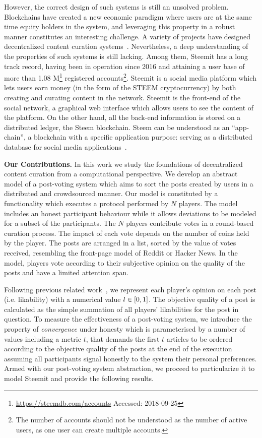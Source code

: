    However, the correct design of such systems is still an unsolved problem. Blockchains have created a new economic paradigm where users are at the same time equity holders in the system, and leveraging this property in a robust manner constitutes an interesting challenge.
   A variety of projects have designed decentralized content curation systems~\cite{synereo,steemit,tcr}. Nevertheless, a deep understanding of the properties of such systems is still lacking. Among them, Steemit
has a long track record, having been in operation since 2016 and attaining a user base of more than 1.08 M\footnote{\url{https://steemdb.com/accounts} Accessed: 2018-09-25} registered accounts\footnote{The number of accounts should not be understood as the number of active users, as one user can create multiple accounts.}. Steemit is a social media platform which lets users earn money (in the form of the STEEM cryptocurrency) by both creating and curating content in the network. Steemit is the front-end of the social network, a graphical web interface which allows users to see the content of the platform. On the other hand, all the back-end information is stored on a distributed ledger, the Steem blockchain. Steem can be understood as an ``app-chain'', a blockchain with a specific application purpose: serving as a distributed database for social media applications~\cite{steemit}.

\noindent  \textbf{Our Contributions.}
In this work we study the foundations of decentralized content curation from a computational perspective. We develop an abstract model of a post-voting system which aims to sort the posts created by users in a distributed and crowdsourced manner.
  Our model is constituted by a functionality which executes a protocol performed by $N$ players. The model includes an honest participant behaviour while it allows deviations to be modeled for a subset of the participants.      The $N$ players contribute votes in a round-based curation process. The impact of each vote depends on the number of coins held by the player.
   The posts are arranged in a list, sorted by the value of votes received, resembling the front-page model of Reddit or Hacker News. In the model, players vote according to their subjective opinion on the quality of the posts and have a limited attention span.

   Following previous related work~\cite{ghosh2011incentivizing,askalidis2013theoretical}, we represent each player's opinion on each post (i.e. likability) with a numerical value $l \in [ 0,1 ]$.
   The objective quality of a post is calculated as the simple summation of all players' likabilities for the post in question. 
   To measure the effectiveness of a post-voting system, we introduce the property of  \textit{convergence} under honesty which is parameterised by a number of values including a metric $t$, that demands the  first $t$ articles to be   ordered according to the objective quality of the posts at the end of the execution assuming all participants signal honestly to the system their personal preferences. 
Armed with our  post-voting system abstraction, we proceed to particularize it to model Steemit and provide the following results. 


